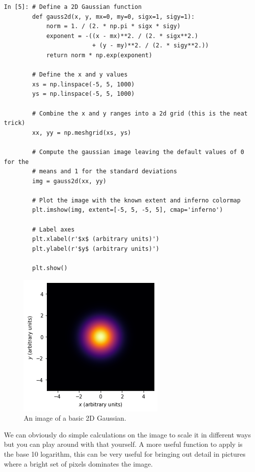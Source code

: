 \begin{lstlisting}[style=PY]
In [5]: # Define a 2D Gaussian function
        def gauss2d(x, y, mx=0, my=0, sigx=1, sigy=1):
            norm = 1. / (2. * np.pi * sigx * sigy)
            exponent = -((x - mx)**2. / (2. * sigx**2.) 
                         + (y - my)**2. / (2. * sigy**2.))
            return norm * np.exp(exponent)
            
        # Define the x and y values
        xs = np.linspace(-5, 5, 1000)
        ys = np.linspace(-5, 5, 1000)
        
        # Combine the x and y ranges into a 2d grid (this is the neat trick)
        xx, yy = np.meshgrid(xs, ys)
        
        # Compute the gaussian image leaving the default values of 0 for the 
        # means and 1 for the standard deviations
        img = gauss2d(xx, yy)
        
        # Plot the image with the known extent and inferno colormap
        plt.imshow(img, extent=[-5, 5, -5, 5], cmap='inferno')

        # Label axes
        plt.xlabel(r'$x$ (arbitrary units)')
        plt.ylabel(r'$y$ (arbitrary units)')
        
        plt.show()
\end{lstlisting}

\begin{figure}[H]
	\centering
	\includegraphics[scale=0.7]{Pictures/gaussimgexample.png}
\caption{An image of a basic 2D Gaussian.}
\label{fig:randimgnoax}
\end{figure}

We can obviously do simple calculations on the image to scale it in different ways but you can play around with that yourself. A more useful function to apply is the base 10 logarithm, this can be very useful for bringing out detail in pictures where a bright set of pixels dominates the image.

